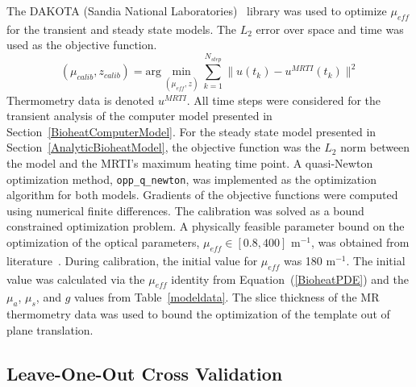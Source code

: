 \documentclass[12pt]{article}
\newcommand{\eqn}[1]{(\ref{#1})}
\begin{document}
The DAKOTA (Sandia National Laboratories)~\cite{eldred2007dakota} library was
used to optimize $\mu_\textit{eff}$  for the transient and steady
state  models. 
The $L_2$ error over space and
time was used as the objective function.
\[
   (\mu_\textit{calib},z_\textit{calib})  = \text{arg}\min_{(\mu_\textit{eff},z)}  
                 \sum_{k=1}^{N_\textit{step}} \| u(t_k) - u^\textit{MRTI}(t_k) \|^2
\]
Thermometry data is denoted $u^\textit{MRTI}$.
All time steps were considered
for the transient analysis of the computer model presented
in Section~\ref{BioheatComputerModel}.
For the steady state model presented in Section~\ref{AnalyticBioheatModel},
the objective function was the $L_2$ norm between the model and the MRTI's maximum heating time point.
A quasi-Newton optimization method, \verb#opp_q_newton#, was implemented as the
optimization algorithm for both models. 
Gradients of the objective functions were computed using numerical
finite differences. The calibration was solved as a bound constrained
optimization problem. A physically feasible parameter bound on the optimization of
the optical parameters, $\mu_\textit{eff} \in [0.8,400]$ m$^{-1}$, was obtained from
literature~\cite{Welch95}. During calibration, the initial value for $\mu_\textit{eff}$
was 180 m$^{-1}$. The initial value was calculated via the $\mu_\textit{eff}$ identity
from Equation~\eqn{BioheatPDE} and the $\mu_\textit{a}$, $\mu_\textit{s}$, and $g$ values
from Table~\ref{modeldata}.  The slice thickness of the MR thermometry data was used to bound the
optimization of the template out of plane translation.  


\subsection{Leave-One-Out Cross Validation } \label{LOOCV_section}
\end{document}

